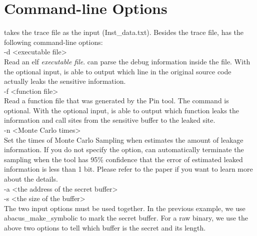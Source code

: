 \section*{Command-line Options}
\tool{} takes the trace file as the input (\textsf{Inst\_data.txt}). Besides the trace file, \tool{} has the following command-line options:
\vspace{6pt}
\\\textsf{-d {<executable file>}}
\\ Read an elf \textit{executable file}. \tool{} can parse the debug information inside the file. With the optional input, \tool{} is able to output which line in the original source code actually leaks the sensitive information.
\vspace{6pt}
\\\textsf{-f {<function file>}}
\\Read a function file that was generated by the Pin tool. The command is optional. With the optional input, \tool{} is able to output which function leaks the information and call sites from the sensitive buffer to the leaked site.
\vspace{6pt}
\\\textsf{-n {<Monte Carlo times>}}
\\ Set the times of Monte Carlo Sampling when \tool{} estimates the amount of leakage information. If you do not specify the option, \tool{} can automatically terminate the sampling when the tool has 95\% confidence that the error of estimated leaked information is less than 1 bit. Please refer to the paper if you want to learn more about the details.
\vspace{6pt}
\\\textsf{-a {<the address of the secret buffer>} \\-s {<the size of the buffer>}}
\\The two input options must be used together. In the previous example, we use \textsf{abacus\_make\_symbolic} to mark the secret buffer. For a raw binary, we use the above two options to tell \tool{} which buffer is the secret and its length.


